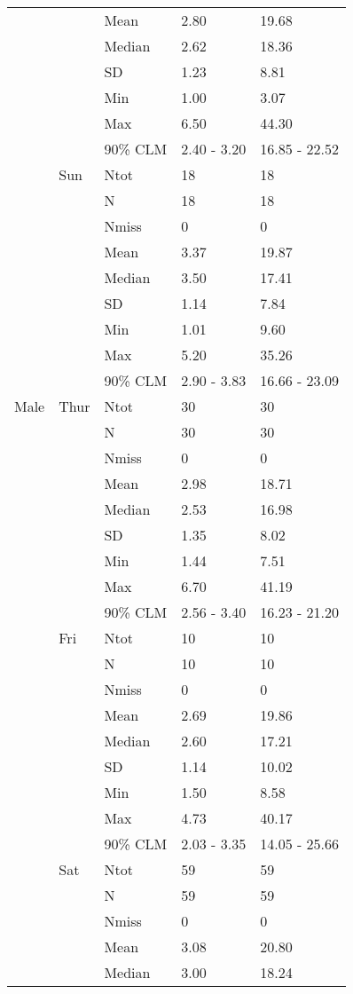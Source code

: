 \documentclass[8pt]{beamer}
\begin{document}
\begin{frame}
\begin{longtable}{p{3cm}llll}
 &  & Mean & 2.80 & 19.68 \\
 &  & Median & 2.62 & 18.36 \\
 &  & SD & 1.23 & 8.81 \\
 &  & Min & 1.00 & 3.07 \\
 &  & Max & 6.50 & 44.30 \\
 &  & 90\% CLM & 2.40 - 3.20 & 16.85 - 22.52 \\
[2ex]
 & Sun & Ntot & 18 & 18 \\
 &  & N & 18 & 18 \\
 &  & Nmiss & 0 & 0 \\
 &  & Mean & 3.37 & 19.87 \\
 &  & Median & 3.50 & 17.41 \\
 &  & SD & 1.14 & 7.84 \\
 &  & Min & 1.01 & 9.60 \\
 &  & Max & 5.20 & 35.26 \\
 &  & 90\% CLM & 2.90 - 3.83 & 16.66 - 23.09 \\
[2ex]
Male & Thur & Ntot & 30 & 30 \\
 &  & N & 30 & 30 \\
 &  & Nmiss & 0 & 0 \\
 &  & Mean & 2.98 & 18.71 \\
 &  & Median & 2.53 & 16.98 \\
 &  & SD & 1.35 & 8.02 \\
 &  & Min & 1.44 & 7.51 \\
 &  & Max & 6.70 & 41.19 \\
 &  & 90\% CLM & 2.56 - 3.40 & 16.23 - 21.20 \\
[2ex]
 & Fri & Ntot & 10 & 10 \\
 &  & N & 10 & 10 \\
 &  & Nmiss & 0 & 0 \\
 &  & Mean & 2.69 & 19.86 \\
 &  & Median & 2.60 & 17.21 \\
 &  & SD & 1.14 & 10.02 \\
 &  & Min & 1.50 & 8.58 \\
 &  & Max & 4.73 & 40.17 \\
 &  & 90\% CLM & 2.03 - 3.35 & 14.05 - 25.66 \\
[2ex]
 & Sat & Ntot & 59 & 59 \\
 &  & N & 59 & 59 \\
 &  & Nmiss & 0 & 0 \\
 &  & Mean & 3.08 & 20.80 \\
 &  & Median & 3.00 & 18.24 \\

\end{longtable}
\end{frame}
\end{document}
